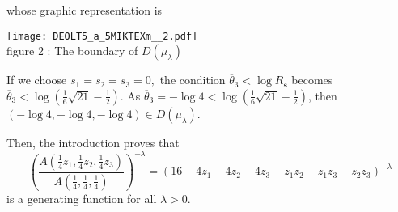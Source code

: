 \documentclass[a4paper,oneside,notitlepage]{article}%
\begin{document}
whose graphic representation is%

\begin{center}
\texttt{[image: DEOLT5\_a\_5MIKTEXm\_\_2.pdf]}
\\
figure 2 : The boundary of $D\left(  \mu_{\lambda}\right)  $%
\label{fig2}%


\end{center}




If we choose $s_{1}=s_{2}=s_{3}=0,$ the condition $\overline{\theta}_{3}<\log
R_{\mathbf{s}}$ becomes $\overline{\theta}_{3}<\log\left(  \frac{1}{6}%
\sqrt{21}-\frac{1}{2}\right)  .$ As $\overline{\theta}_{3}=-\log4<\log\left(
\frac{1}{6}\sqrt{21}-\frac{1}{2}\right)  $, then $\left(  -\log4,-\log
4,-\log4\right)  \in D\left(  \mu_{\lambda}\right)  $.

Then, the introduction proves that
\[
\left(  \frac{A\left(  \frac{1}{4}z_{1},\frac{1}{4}z_{2},\frac{1}{4}%
z_{3}\right)  }{A\left(  \frac{1}{4},\frac{1}{4},\frac{1}{4}\right)  }\right)
^{-\lambda}=\left(  16-4z_{1}-4z_{2}-4z_{3}-z_{1}z_{2}-z_{1}z_{3}-z_{2}%
z_{3}\right)  ^{-\lambda}%
\]
is a generating function for all $\lambda>0$.
\end{document}
